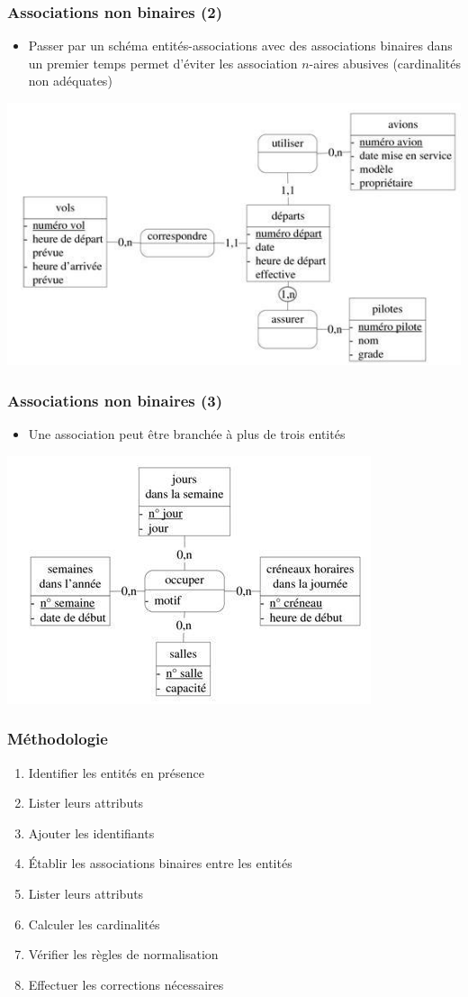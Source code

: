 \begin{frame}
  \frametitle{Associations non binaires (2)}
  \begin{itemize}
    \item Passer par un schéma entités-associations avec des associations binaires dans un premier temps
      permet d'éviter les association $n$-aires abusives (cardinalités non adéquates)
  \end{itemize}
  \begin{center}
    \includegraphics[width=0.8\linewidth]{assocation_ternaire2.jpg}
  \end{center}
\end{frame}

\begin{frame}
  \frametitle{Associations non binaires (3)}
  \begin{itemize}
    \item Une association peut être branchée à plus de trois entités
  \end{itemize}
  \begin{center}
    \includegraphics[width=0.6\linewidth]{assocation_quaternaire.jpg}
  \end{center}
\end{frame}


\begin{frame}
  \frametitle{Méthodologie}
  \begin{enumerate}
    \item Identifier les entités en présence
    \item Lister leurs attributs
    \item Ajouter les identifiants
    \item Établir les associations binaires entre les entités
    \item Lister leurs attributs
    \item Calculer les cardinalités
    \item Vérifier les règles de normalisation
    \item Effectuer les corrections nécessaires
  \end{enumerate}
\end{frame}

